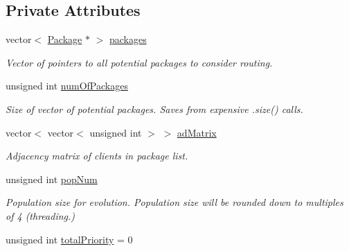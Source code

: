 \subsection*{Private Attributes}
\begin{DoxyCompactItemize}
\item 
vector$<$ \hyperlink{classPackage}{Package} $\ast$ $>$ \hyperlink{classGenetic_a9b8b621994de828672ac1473a9bb5a36}{packages}\hypertarget{classGenetic_a9b8b621994de828672ac1473a9bb5a36}{}\label{classGenetic_a9b8b621994de828672ac1473a9bb5a36}

\begin{DoxyCompactList}\small\item\em Vector of pointers to all potential packages to consider routing. \end{DoxyCompactList}\item 
unsigned int \hyperlink{classGenetic_ae3e64f60ae2574e900ebdacdb1296147}{num\+Of\+Packages}\hypertarget{classGenetic_ae3e64f60ae2574e900ebdacdb1296147}{}\label{classGenetic_ae3e64f60ae2574e900ebdacdb1296147}

\begin{DoxyCompactList}\small\item\em Size of vector of potential packages. Saves from expensive .size() calls. \end{DoxyCompactList}\item 
vector$<$ vector$<$ unsigned int $>$ $>$ \hyperlink{classGenetic_a00e74a00ceef611bdb1f409ab0c5b2fb}{ad\+Matrix}
\begin{DoxyCompactList}\small\item\em Adjacency matrix of clients in package list. \end{DoxyCompactList}\item 
unsigned int \hyperlink{classGenetic_a644a04082c893bfecba4b60e6c881dcd}{pop\+Num}\hypertarget{classGenetic_a644a04082c893bfecba4b60e6c881dcd}{}\label{classGenetic_a644a04082c893bfecba4b60e6c881dcd}

\begin{DoxyCompactList}\small\item\em Population size for evolution. Population size will be rounded down to multiples of 4 (threading.) \end{DoxyCompactList}\item 
unsigned int \hyperlink{classGenetic_ae42bc84b2c9c5fcddd339dd037d587a1}{total\+Priority} = 0\hypertarget{classGenetic_ae42bc84b2c9c5fcddd339dd037d587a1}{}\label{classGenetic_ae42bc84b2c9c5fcddd339dd037d587a1}


\end{DoxyCompactItemize}
